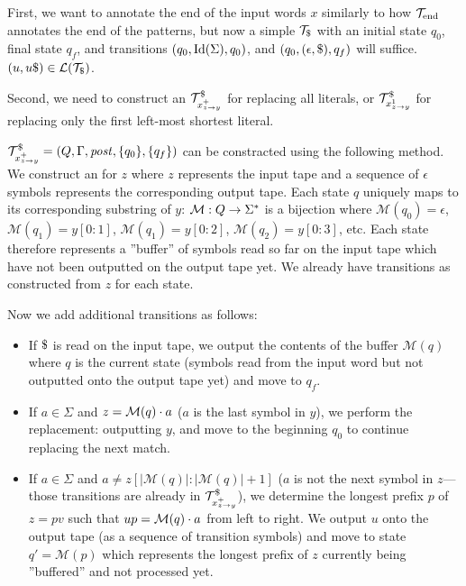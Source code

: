First, we want to annotate the end of the input words $x$ similarly to how $\mathcal{T}_{\text{end}}$ annotates the end of the patterns, but now a simple \nft $\ft_\marker$ with an initial state $q_0$, final state $q_f$, and transitions $(q_0, \text{Id}(\Sigma), q_0)$, and $(q_0, (\epsilon, \$), q_f)$ will suffice. $(u, u\$) \in \mathcal{L}(\mathcal{T}_\$)$.

Second, we need to construct an \nft $\mathcal{T}^\$_{x^{+}_{z \rightarrow y}}$ for replacing all literals, or $\mathcal{T}^\$_{x^{1}_{z \rightarrow y}}$ for replacing only the first left-most shortest literal.

$\mathcal{T}^\$_{x^{+}_{z \rightarrow y}} = (Q, \Gamma, \mathit{post}, \{ q_0 \}, \{ q_f \})$ can be constracted using the following method.
We construct an \nft for $z$ where $z$ represents the input tape and a sequence of $\epsilon$ symbols represents the corresponding output tape.
Each state $q$ uniquely maps to its corresponding substring of $y$: $\mathcal{M}: Q \rightarrow \Sigma^*$ is a bijection where $\mathcal{M}(q_0) = \epsilon$, $\mathcal{M}(q_1) = y[0:1]$, $\mathcal{M}(q_1) = y[0:2]$, $\mathcal{M}(q_2) = y[0:3]$, etc.
Each state therefore represents a ''buffer'' of symbols read so far on the input tape which have not been outputted on the output tape yet.
We already have transitions as constructed from $z$ for each state.

Now we add additional transitions as follows:\newline
\begin{itemize}
  \item If $\marker$ is read on the input tape, we output the contents of the buffer $\mathcal{M}(q)$ where $q$ is the current state (symbols read from the input word but not outputted onto the output tape yet) and move to $q_f$.
  \item If $a \in \Sigma$ and $z = \mathcal{M}(q) \cdot a$ ($a$ is the last symbol in $y$), we perform the replacement: outputting $y$, and move to the beginning $q_0$ to continue replacing the next match.
  \item If $a \in \Sigma$ and $a \neq z[|\mathcal{M}(q)|:|\mathcal{M}(q)| + 1]$ ($a$ is not the next symbol in $z$---those transitions are already in  $\mathcal{T}^\$_{x^{+}_{z \rightarrow y}}$), we determine the longest prefix $p$ of $z = pv$ such that $up = \mathcal{M}(q) \cdot a$ from left to right.
  We output $u$ onto the output tape (as a sequence of transition symbols) and move to state $q' = \mathcal{M}(p)$ which represents the longest prefix of $z$ currently being ''buffered'' and not processed yet.
\end{itemize}

